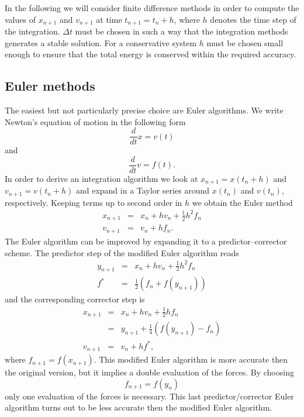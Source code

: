 In the following we will consider finite difference methods in order to compute
the values of $x_{n+1}$ and $v_{n+1}$ at time $t_{n+1} = t_n + h$,
where $h$ denotes the time step of the integration. $\Delta t$ must be
chosen in such a way that the integration methods generates a stable
solution. For a conservative system $h$ must be chosen small enough to
ensure that the total energy is conserved within the required accuracy.

\subsection{Euler methods}
The easiest but not particularly precise choice are Euler algorithms. 
We write Newton's equation of motion in the following form
\begin{displaymath}
  \frac{d}{dt} x = v(t)
\end{displaymath}
and
\begin{displaymath}
  \frac{d}{dt} v = f(t).
\end{displaymath}
In order to derive an integration algorithm we look at 
$x_{n+1} = x(t_n +h)$ and $v_{n+1} = v(t_n +h)$ and expand in a
Taylor series around $x(t_n)$ and $v(t_n)$, respectively. Keeping terms up to
second order in $h$ we obtain the Euler method
\begin{eqnarray*}
  x_{n+1} &=&  x_n + h v_n + \frac{1}{2} h^2 f_n  \\
  v_{n+1} & = & v_n + h f_n.
\end{eqnarray*}
The Euler algorithm can be improved by expanding it to a predictor--corrector
scheme. The predictor step of the modified Euler algorithm reads
\begin{eqnarray*}
  y_{n+1} &=& x_n + h v_n + \frac{1}{2} h^2 f_n  \\
   f^{\ast} & = & \frac{1}{2} \left( f_n + f(y_{n+1}) \right)
\end{eqnarray*}
and the corresponding corrector step is
\begin{eqnarray*}
  x_{n+1} & = & x_n + h v_n + \frac{1}{2} h f_n \\
          & = & y_{n+1} + \frac{1}{4} 
           \left( f(y_{n+1}) - f_n \right) \\
    v_{n+1} & = & v_n + h f^{\ast},
\end{eqnarray*}
where $f_{n+1} = f(x_{n+1})$.
This modified Euler algorithm is more accurate then the original version, but
it implies a double evaluation of the forces. By choosing
\begin{displaymath}
  f_{n+1} = f(y_n)
\end{displaymath}
only one evaluation of the forces is necessary. This last predictor/corrector
Euler algorithm turns out to be less accurate then the modified Euler
algorithm.

